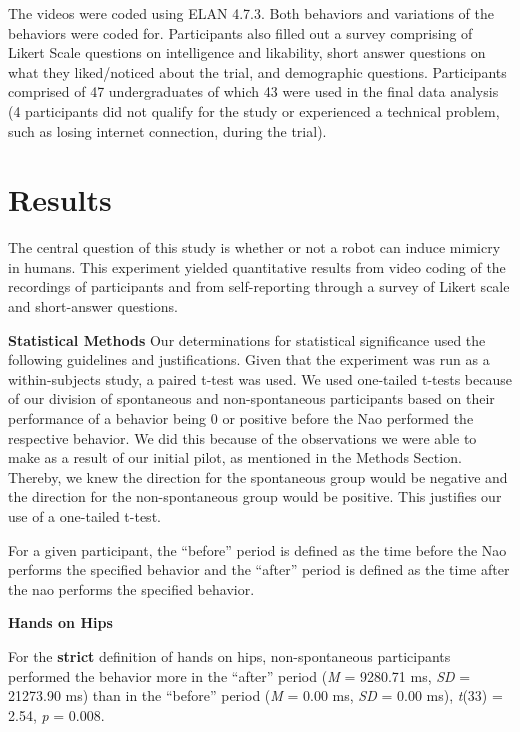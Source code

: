 \documentclass{acm_proc_article-sp}
\begin{document}
The videos were coded using ELAN 4.7.3. Both behaviors and variations of the behaviors were coded for. Participants also filled out a survey comprising of Likert Scale questions on intelligence and likability, short answer questions on what they liked/noticed about the trial, and demographic questions. Participants comprised of 47 undergraduates of which 43 were used in the final data analysis (4 participants did not qualify for the study or experienced a technical problem, such as losing internet connection, during the trial).

\section{Results}
The central question of this study is whether or not a robot can induce mimicry in humans. This experiment yielded quantitative results from video coding of the recordings of participants and from self-reporting through a survey of Likert scale and short-answer questions. 

\textbf{Statistical Methods} Our determinations for statistical significance used the following guidelines and justifications. 
Given that the experiment was run as a within-subjects study, a paired t-test was used. We used one-tailed t-tests because of our division of spontaneous and non-spontaneous participants based on their performance of a behavior being 0 or positive before the Nao performed the respective behavior. We did this because of the observations we were able to make as a result of our initial pilot, as mentioned in the Methods Section. Thereby, we knew the direction for the spontaneous group would be negative and the direction for the non-spontaneous group would be positive. This justifies our use of a one-tailed t-test. 

For a given participant, the ``before'' period is defined as the time before the Nao performs the specified behavior and the ``after'' period is defined as the time after the nao performs the specified behavior.

\textbf{Hands on Hips} 

For the \textbf{strict} definition of hands on hips, non-spontaneous participants performed the behavior more in the ``after'' period (\textit{M} = 9280.71 ms, \textit{SD} = 21273.90 ms) than in the ``before'' period (\textit{M} = 0.00 ms, \textit{SD} = 0.00 ms), \textit{t}(33) = 2.54, \textit{p} = 0.008.
\end{document}
